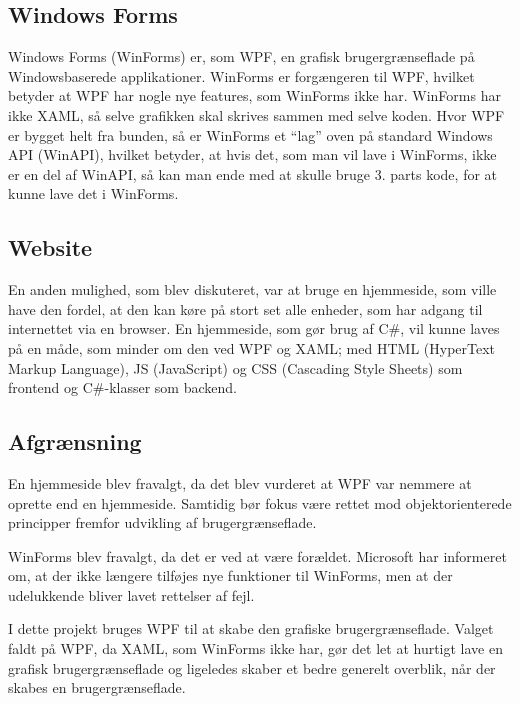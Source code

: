 \subsection{Windows Forms}
Windows Forms (WinForms) er, som WPF, en grafisk brugergrænseflade på Windowsbaserede applikationer. 
WinForms er forgængeren til WPF, hvilket betyder at WPF har nogle nye features, som WinForms ikke har.
WinForms har ikke XAML, så selve grafikken skal skrives sammen med selve koden. 
Hvor WPF er bygget helt fra bunden, så er WinForms et ``lag'' oven på standard Windows API (WinAPI), hvilket betyder, at hvis det, som man vil lave i WinForms, ikke er en del af WinAPI, så kan man ende med at skulle bruge 3. parts kode, for at kunne lave det i WinForms.\citep{winforms2}

\subsection{Website}
En anden mulighed, som blev diskuteret, var at bruge en hjemmeside, som ville have den fordel, at den kan køre på stort set alle enheder, som har adgang til internettet via en browser. 
En hjemmeside, som gør brug af C\#, vil kunne laves på en måde, som minder om den ved WPF og XAML; med HTML (HyperText Markup Language), JS (JavaScript) og CSS (Cascading Style Sheets) som frontend og C\#-klasser som backend. 

\subsection{Afgrænsning}
En hjemmeside blev fravalgt, da det blev vurderet at WPF var nemmere at oprette end en hjemmeside. 
Samtidig bør fokus være rettet mod objektorienterede principper fremfor udvikling af brugergrænseflade.

WinForms blev fravalgt, da det er ved at være forældet.
Microsoft har informeret om, at der ikke længere tilføjes nye funktioner til WinForms, men at der udelukkende bliver lavet rettelser af fejl.\citep{winforms}

I dette projekt bruges WPF til at skabe den grafiske brugergrænseflade. 
Valget faldt på WPF, da XAML, som WinForms ikke har, gør det let at hurtigt lave en grafisk brugergrænseflade og ligeledes skaber et bedre generelt overblik, når der skabes en brugergrænseflade.


